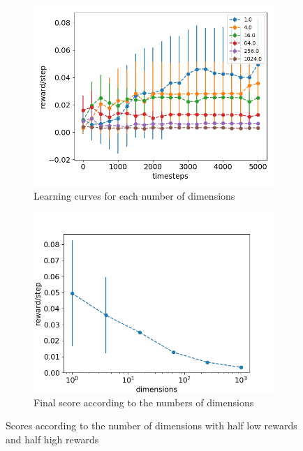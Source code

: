 \documentclass{article}
\begin{document}
\begin{figure}[H]
  \centering
  \begin{subfigure}[b]{0.45\linewidth}
    \includegraphics[width=\linewidth]{Study_3/half_reset_norm/scores_dimensions.png}
      \caption{Learning curves for each number of dimensions}
  \end{subfigure}
  \begin{subfigure}[b]{0.47\linewidth}
    \includegraphics[width=\linewidth]{Study_3/half_reset_norm/total_scores.png}
    \caption{Final score according to the numbers of dimensions}
  \end{subfigure}
  \caption{Scores according to the number of dimensions with half low rewards and half high rewards}
  \label{fig:curves_dimensions_half_reset_norm}
\end{figure}
\end{document}
